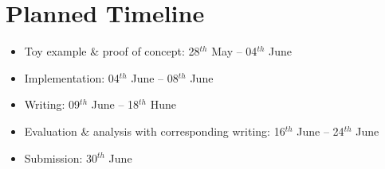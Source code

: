 \section*{Planned Timeline}
\begin{itemize}[noitemsep]
    \item Toy example \& proof of concept: 28$^{th}$ May -- 04$^{th}$ June
    \item Implementation: 04$^{th}$ June -- 08$^{th}$ June
    \item Writing: 09$^{th}$ June -- 18$^{th}$ Hune
    \item Evaluation \& analysis with corresponding writing: 16$^{th}$ June -- 24$^{th}$ June
    \item Submission: 30$^{th}$ June
\end{itemize}